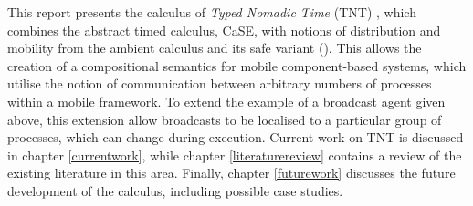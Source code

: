 This report presents the calculus of \emph{Typed Nomadic Time} (TNT)
\cite{hughes:nt}, which combines the abstract timed calculus, CaSE, with
notions of distribution and mobility from the ambient calculus and its
safe variant (\cite{sangiorgi:mobsafeambients}).  This
allows the creation of a compositional semantics for mobile
component-based systems, which utilise the notion of communication
between arbitrary numbers of processes within a mobile framework.  To
extend the example of a broadcast agent given above, this extension
allow broadcasts to be localised to a particular group of processes,
which can change during execution.  Current work on TNT is discussed in
chapter \ref{currentwork}, while chapter \ref{literaturereview} contains
a review of the existing literature in this area.  Finally, chapter
\ref{futurework} discusses the future development of the calculus,
including possible case studies.
